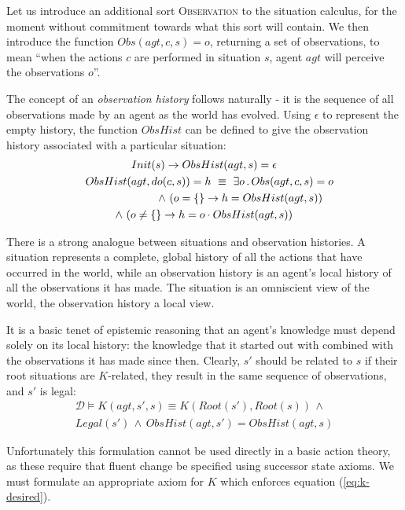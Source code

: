 \documentclass{ifaamas-submission}
\newcommand{\noun}[1]{\textsc{#1}}
\begin{document}
Let us introduce an additional sort \noun{Observation}
to the situation calculus, for the moment without
commitment towards what this sort will contain. We
then introduce the function $Obs(agt,c,s)=o$, returning
a set of observations, to mean {}``when the actions $c$ are performed
in situation $s$, agent $agt$ will perceive the observations $o$''.

The concept of an \emph{observation history} follows naturally - it
is the sequence of all observations made by an agent as the world
has evolved. Using $\epsilon$ to represent the empty history,
the function $ObsHist$ can be defined  to give the observation history
associated with a particular situation:
\begin{multline}
Init(s)\rightarrow ObsHist(agt,s)=\epsilon\\
\shoveleft{ObsHist(agt,do(c,s))=h\,\,\equiv\,\,}
\exists o\,.\, Obs(agt,c,s)=o\\
\shoveright{\wedge\,\left(o=\{\}\rightarrow h=ObsHist(agt,s)\right)}\\
\wedge\,\left(o\neq\{\}\rightarrow h=o\cdot ObsHist(agt,s)\right)\label{eqn:obshist_defn}\end{multline}

There is a strong analogue between situations and observation histories.
A situation represents a complete, global history of all the actions
that have occurred in the world, while an observation history is an
agent's local history of all the observations it has made. The situation
is an omniscient view of the world, the observation history a local
view.

It is a basic tenet of epistemic reasoning that an agent's knowledge must
depend solely on its local history: the knowledge that it started out with
combined with the observations it has made since then.
Clearly, $s'$ should be related to $s$ if their root situations are
$K$-related, they result in the same sequence of observations, and 
$s'$ is legal:
\begin{multline}
\label{eq:k-desired}
\mathcal{D}\models K(agt,s',s)\equiv K(Root(s'),Root(s))\,\wedge\\
Legal(s')\,\wedge\, ObsHist(agt,s')=ObsHist(agt,s)
\end{multline}

Unfortunately this formulation cannot be used directly in a basic action
theory, as these require that fluent change be specified
using successor state axioms.  We must formulate an appropriate axiom for
$K$ which enforces equation (\ref{eq:k-desired}).
\end{document}
